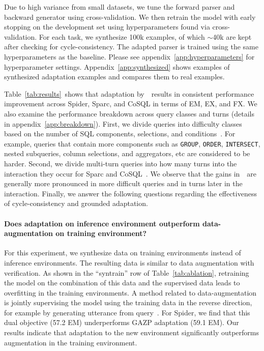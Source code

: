 \documentclass[11pt,a4paper]{article}
\begin{document}
Due to high variance from small datasets, we tune the forward parser and backward generator using cross-validation.
We then retrain the model with early stopping on the development set using hyperparameters found via cross-validation.
For each task, we synthesize 100k examples, of which $\sim$40k are kept after checking for cycle-consistency.
The adapted parser is trained using the same hyperparameters as the baseline.
Please see appendix~\ref{app:hyperparameters} for hyperparameter settings.
Appendix~\ref{app:synthesized} shows examples of synthesized adaptation examples and compares them to real examples.


Table~\ref{tab:results}~shows that adaptation by~\modelnameshort~results in consistent performance improvement across Spider, Sparc, and CoSQL in terms of EM, EX, and FX.
We also examine the performance breakdown across query classes and turns (details in appendix~\ref{app:breakdown}).
First, we divide queries into difficulty classes based on the number of SQL components, selections, and conditions~\citep{yu2018spider}.
For example, queries that contain more components such as \texttt{GROUP}, \texttt{ORDER}, \texttt{INTERSECT}, nested subqueries, column selections, and aggregators, etc are considered to be harder.
Second, we divide multi-turn queries into how many turns into the interaction they occur for Sparc and CoSQL~\citep{yu2019sparc,yu2019cosql}.
We observe that the gains in~\modelnameshort~are generally more pronounced in more difficult queries and in turns later in the interaction. 
Finally, we answer the following questions regarding the effectiveness of cycle-consistency and grounded adaptation.



\paragraph{Does adaptation on inference environment outperform data-augmentation on training environment?}
For this experiment, we synthesize data on training environments instead of inference environments.
The resulting data is similar to data augmentation with verification.
As shown in the ``syntrain'' row of Table~\ref{tab:ablation}, retraining the model on the combination of this data and the supervised data leads to overfitting in the training environments.
A method related to data-augmentation is jointly supervising the model using the training data in the reverse direction, for example by generating utterance from query~\citep{fried2018speaker,cao2019dual}.
For Spider, we find that this dual objective (57.2 EM) underperforms GAZP adaptation (59.1 EM).
Our results indicate that adaptation to the new environment significantly outperforms augmentation in the training environment.
\end{document}
